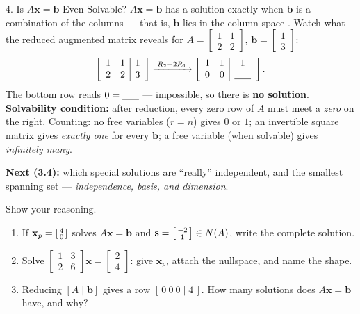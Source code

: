 \documentclass[10pt]{article}
\newcommand{\xx}{\mathbf{x}}
\newcommand{\bb}{\mathbf{b}}
\newcommand{\svec}{\mathbf{s}}
\begin{document}
\begin{notesbox}{4. Is $A\xx=\bb$ Even Solvable?}
$A\xx=\bb$ has a solution exactly when $\bb$ is a combination of the columns --- that is, $\bb$ lies in
the column space \blank{1.2cm}. Watch what the reduced augmented matrix reveals for
$A=\begin{bmatrix} 1 & 1 \\ 2 & 2 \end{bmatrix}$, $\bb=\begin{bmatrix} 1 \\ 3 \end{bmatrix}$:
\[
  \left[\begin{array}{cc|c} 1 & 1 & 1 \\ 2 & 2 & 3 \end{array}\right]
  \xrightarrow{\;R_2-2R_1\;}
  \left[\begin{array}{cc|c} 1 & 1 & 1 \\ 0 & 0 & \blank{0.6cm} \end{array}\right].
\]
The bottom row reads $0=\blank{0.6cm}$ --- impossible, so there is \textbf{no solution}.
\textbf{Solvability condition:} after reduction,
every zero row of $A$ must meet a \emph{zero} on the right. Counting: no free variables ($r=n$) gives $0$
or $1$; an invertible square matrix gives \emph{exactly one} for every $\bb$; a free variable (when
solvable) gives \emph{infinitely many}.

\vspace{2pt}
\textbf{Next (3.4):} which special solutions are ``really'' independent, and the smallest spanning set ---
\emph{independence, basis, and dimension}.
\end{notesbox}

\begin{practicebox}
Show your reasoning.
\begin{enumerate}[leftmargin=1.6em, itemsep=2pt]
  \item If $\xx_p=\begin{bsmallmatrix} 4\\0 \end{bsmallmatrix}$ solves $A\xx=\bb$ and $\svec=\begin{bsmallmatrix} -2\\1 \end{bsmallmatrix}\in N(A)$, write the complete solution. \writeline
  \item Solve $\begin{bmatrix} 1 & 3 \\ 2 & 6 \end{bmatrix}\xx=\begin{bmatrix} 2 \\ 4 \end{bmatrix}$: give $\xx_p$, attach the nullspace, and name the shape. \writeline
  \item Reducing $[A\mid\bb]$ gives a row $[\,0\ 0\ 0\mid 4\,]$. How many solutions does $A\xx=\bb$ have, and why? \writeline
\end{enumerate}
\end{practicebox}
\end{document}
